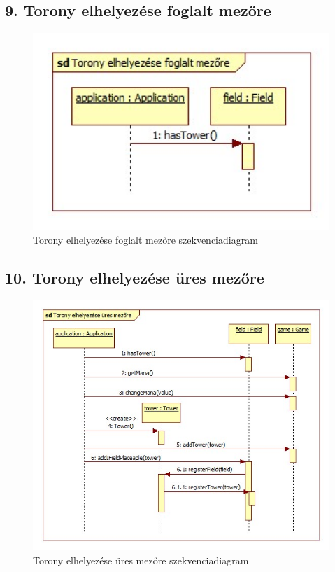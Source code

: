 \subsection{9. Torony elhelyezése foglalt mezőre}
\begin{figure}[H]
\begin{center}
\includegraphics[width=17cm]{chapters/chapter05/images/sd_Torony_elhelyezese_foglalt_mezore.jpg}
\caption{Torony elhelyezése foglalt mezőre szekvenciadiagram}
\label{fig:sd_Torony_elhelyezese_foglalt_mezore}
\end{center}
\end{figure}

\subsection{10. Torony elhelyezése üres mezőre}
\begin{figure}[H]
\begin{center}
\includegraphics[width=17cm]{chapters/chapter05/images/sd_Torony_elhelyezese_ures_mezore.jpg}
\caption{Torony elhelyezése üres mezőre szekvenciadiagram}
\label{fig:sd_Torony_elhelyezese_ures_mezore}
\end{center}
\end{figure}

